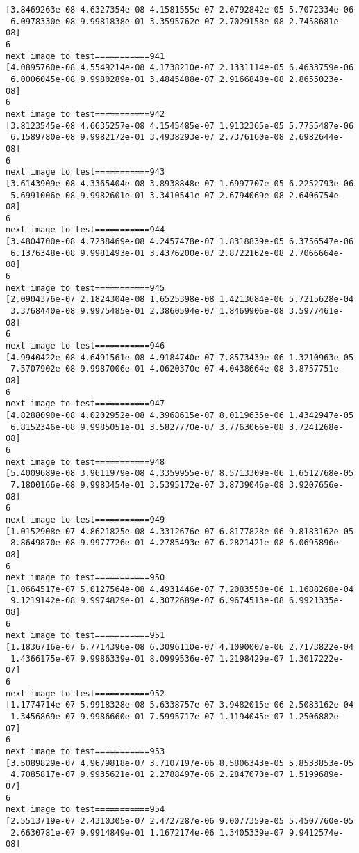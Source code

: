 \documentclass[11pt]{article}
\begin{document}
\begin{Verbatim}[commandchars=\\\{\}]
[3.8469263e-08 4.6327354e-08 4.1581555e-07 2.0792842e-05 5.7072334e-06
 6.0978330e-08 9.9981838e-01 3.3595762e-07 2.7029158e-08 2.7458681e-08]
6
next image to test===========941
[4.0895760e-08 4.5549214e-08 4.1738210e-07 2.1331114e-05 6.4633759e-06
 6.0006045e-08 9.9980289e-01 3.4845488e-07 2.9166848e-08 2.8655023e-08]
6
next image to test===========942
[3.8123545e-08 4.6635257e-08 4.1545485e-07 1.9132365e-05 5.7755487e-06
 6.1589780e-08 9.9982172e-01 3.4938293e-07 2.7376160e-08 2.6982644e-08]
6
next image to test===========943
[3.6143909e-08 4.3365404e-08 3.8938848e-07 1.6997707e-05 6.2252793e-06
 5.6991006e-08 9.9982601e-01 3.3410541e-07 2.6794069e-08 2.6406754e-08]
6
next image to test===========944
[3.4804700e-08 4.7238469e-08 4.2457478e-07 1.8318839e-05 6.3756547e-06
 6.1376348e-08 9.9981493e-01 3.4376200e-07 2.8722162e-08 2.7066664e-08]
6
next image to test===========945
[2.0904376e-07 2.1824304e-08 1.6525398e-08 1.4213684e-06 5.7215628e-04
 3.3768440e-08 9.9975485e-01 2.3860594e-07 1.8469906e-08 3.5977461e-08]
6
next image to test===========946
[4.9940422e-08 4.6491561e-08 4.9184740e-07 7.8573439e-06 1.3210963e-05
 7.5707902e-08 9.9987006e-01 4.0620370e-07 4.0438664e-08 3.8757751e-08]
6
next image to test===========947
[4.8288090e-08 4.0202952e-08 4.3968615e-07 8.0119635e-06 1.4342947e-05
 6.8152346e-08 9.9985051e-01 3.5827770e-07 3.7763066e-08 3.7241268e-08]
6
next image to test===========948
[5.4009689e-08 3.9611979e-08 4.3359955e-07 8.5713309e-06 1.6512768e-05
 7.1800166e-08 9.9983454e-01 3.5395172e-07 3.8739046e-08 3.9207656e-08]
6
next image to test===========949
[1.0152908e-07 4.8621825e-08 4.3312676e-07 6.8177828e-06 9.8183162e-05
 8.8649870e-08 9.9977726e-01 4.2785493e-07 6.2821421e-08 6.0695896e-08]
6
next image to test===========950
[1.0664517e-07 5.0127564e-08 4.4931446e-07 7.2083558e-06 1.1688268e-04
 9.1219142e-08 9.9974829e-01 4.3072689e-07 6.9674513e-08 6.9921335e-08]
6
next image to test===========951
[1.1836716e-07 6.7714396e-08 6.3096110e-07 4.1090007e-06 2.7173822e-04
 1.4366175e-07 9.9986339e-01 8.0999536e-07 1.2198429e-07 1.3017222e-07]
6
next image to test===========952
[1.1774714e-07 5.9918328e-08 5.6338757e-07 3.9482015e-06 2.5083162e-04
 1.3456869e-07 9.9986660e-01 7.5995717e-07 1.1194045e-07 1.2506882e-07]
6
next image to test===========953
[3.5089829e-07 4.9679818e-07 3.7107197e-06 8.5806343e-05 5.8533853e-05
 4.7085817e-07 9.9935621e-01 2.2788497e-06 2.2847070e-07 1.5199689e-07]
6
next image to test===========954
[2.5513719e-07 2.4310305e-07 2.4727287e-06 9.0077359e-05 5.4507760e-05
 2.6630781e-07 9.9914849e-01 1.1672174e-06 1.3405339e-07 9.9412574e-08]

\end{Verbatim}
\end{document}

